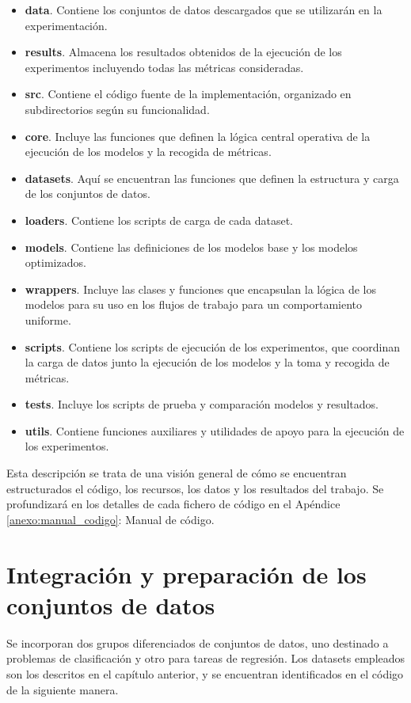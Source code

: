 \documentclass[a4paper,12pt,twoside,final]{book}
\begin{document}
\newpage
\begin{itemize}
  \item \textbf{data}. Contiene los conjuntos de datos descargados que se utilizarán en la experimentación.
  \item \textbf{results}. Almacena los resultados obtenidos de la ejecución de los experimentos incluyendo todas las
  métricas consideradas.
  \item \textbf{src}. Contiene el código fuente de la implementación, organizado en subdirectorios según su
  funcionalidad.
  \item \textbf{core}. Incluye las funciones que definen la lógica central operativa de la ejecución de los modelos y
  la recogida de métricas.
  \item \textbf{datasets}. Aquí se encuentran las funciones que definen la estructura y carga de los conjuntos de
  datos.
  \item \textbf{loaders}. Contiene los scripts de carga de cada dataset.
  \item \textbf{models}. Contiene las definiciones de los modelos base y los modelos optimizados.
  \item \textbf{wrappers}. Incluye las clases y funciones que encapsulan la lógica de los modelos para su uso en los
  flujos de trabajo para un comportamiento uniforme.
  \item \textbf{scripts}. Contiene los scripts de ejecución de los experimentos, que coordinan la carga de datos
  junto la ejecución de los modelos y la toma y recogida de métricas.
  \item \textbf{tests}. Incluye los scripts de prueba y comparación modelos y resultados.
  \item \textbf{utils}. Contiene funciones auxiliares y utilidades de apoyo para la ejecución de los experimentos.
\end{itemize}

Esta descripción se trata de una visión general de cómo se encuentran estructurados el código, los recursos, los
datos y los resultados del trabajo. Se profundizará en los detalles de cada fichero de código en el Apéndice
\ref{anexo:manual_codigo}: Manual de código.

\section{Integración y preparación de los conjuntos de datos}
Se incorporan dos grupos diferenciados de conjuntos de datos, uno destinado a problemas de clasificación y otro para
tareas de regresión. Los datasets empleados son los descritos en el capítulo anterior, y se encuentran identificados
en el código de la siguiente manera.\\
\end{document}
